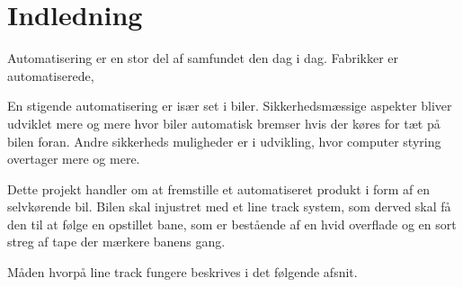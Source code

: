 \section{Indledning}

Automatisering er en stor del af samfundet den dag i dag. Fabrikker er automatiserede, \newline

En stigende automatisering er især set i biler. Sikkerhedsmæssige aspekter bliver udviklet mere og mere hvor biler automatisk bremser hvis der køres for tæt på bilen foran. Andre sikkerheds muligheder er i udvikling, hvor computer styring overtager mere og mere.\newline 
   
Dette projekt handler om at fremstille et automatiseret produkt i form af en selvkørende bil. Bilen skal injustret med et line track system, som derved skal få den til at følge en opstillet bane, som er bestående af en hvid overflade og en sort streg af tape der mærkere banens gang.\newline

Måden hvorpå line track fungere beskrives i det følgende afsnit.